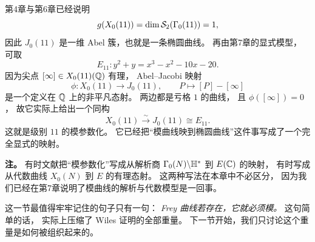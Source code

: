 \begin{example}[级别 $11$ 的模参数化]
\label{ex:ch10-x011-parametrization}
第4章与第6章已经说明
\[
  g(X_0(11))=\dim \mathcal{S}_2(\Gamma_0(11))=1,
\]
因此 $J_0(11)$ 是一维 Abel 簇，也就是一条椭圆曲线。
再由第7章的显式模型，
可取
\[
  E_{11}\colon y^2+y=x^3-x^2-10x-20.
\]
因为尖点 $[\infty]\in X_0(11)(\mathbb{Q})$ 有理，
Abel--Jacobi 映射
\[
  \phi\colon X_0(11)\longrightarrow J_0(11),
  \qquad
  P\longmapsto [P]-[\infty]
\]
是一个定义在 $\mathbb{Q}$ 上的非平凡态射。
两边都是亏格 $1$ 的曲线，
且 $\phi([\infty])=0$，
故它实际上给出一个同构
\[
  X_0(11)\xrightarrow{\ \sim\ }J_0(11)\cong E_{11}.
\]
这就是级别 $11$ 的模参数化。
它已经把“模曲线映到椭圆曲线”这件事写成了一个完全显式的映射。
\end{example}

\textbf{注。}
有时文献把“模参数化”写成从解析商 $\Gamma_0(N)\backslash\mathbb{H}^*$ 到 $E(\mathbb{C})$ 的映射，
有时写成从代数曲线 $X_0(N)$ 到 $E$ 的有理态射。
这两种写法在本章中不必区分，
因为我们已经在第7章说明了模曲线的解析与代数模型是一回事。

这一节最值得牢牢记住的句子只有一句：
\emph{Frey 曲线若存在，它就必须模。}
这句简单的话，
实际上压缩了 Wiles 证明的全部重量。
下一节开始，我们只讨论这个重量是如何被组织起来的。
